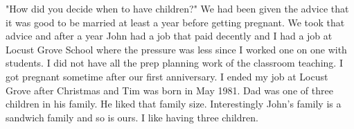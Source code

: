 "How did you decide when to have children?"
We had been given the advice that it was good to be married at least a year before getting pregnant. We took that advice and after a year John had a job that paid decently and I had a job at Locust Grove School where the pressure was less since I worked one on one with students. I did not have all the prep planning work of the classroom teaching. 
I got pregnant sometime after our first anniversary. I ended my job at Locust Grove after Christmas and Tim was born in May 1981. 
Dad was one of three children in his family. He liked that family size. Interestingly John's family is a sandwich family and so is ours. I like having three children.




